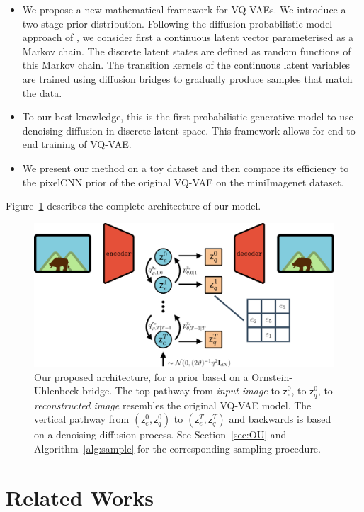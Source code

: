 \documentclass[nolayout]{article}
\theoremstyle{plain}
\theoremstyle{definition}
\theoremstyle{remark}
\newcommand{\latentcont}{\mathsf{z}_e}
\newcommand{\latentdis}{\mathsf{z}_q}
\begin{document}
\begin{itemize}
    \item We propose a new mathematical framework for VQ-VAEs. We introduce a two-stage prior distribution. Following the diffusion probabilistic model approach of \cite{ho2020denoising}, we consider first a continuous latent vector parameterised as a Markov chain. The discrete latent states are defined  as random functions of this Markov chain. The  transition kernels of the continuous latent variables are trained using diffusion bridges to gradually produce samples that match the data.
    \item  To our best knowledge, this is the first probabilistic generative model to use denoising diffusion in discrete latent space. This framework allows for end-to-end training of VQ-VAE.
    \item We present our method on a toy dataset and then compare its efficiency to the pixelCNN prior of the original VQ-VAE on the miniImagenet dataset.
\end{itemize}
Figure~\ref{fig:archi} describes the complete architecture of our model.
\begin{figure}[h]
    \centering
    \includegraphics[width=\linewidth]{images/Archi.png}
    \caption{Our proposed architecture, for a prior based on a Ornstein-Uhlenbeck bridge. The top pathway from \textit{input image} to $\latentcont^0$, to $\latentdis^0$, to \textit{reconstructed image} resembles the original VQ-VAE model. The vertical pathway from $(\latentcont^0, \latentdis^0)$ to $(\latentcont^T, \latentdis^T)$ and backwards is based on a denoising diffusion process. See Section~\ref{sec:OU} and Algorithm~\ref{alg:sample} for the corresponding sampling procedure.}
    \label{fig:archi}
\end{figure}

\section{Related Works}
\end{document}

